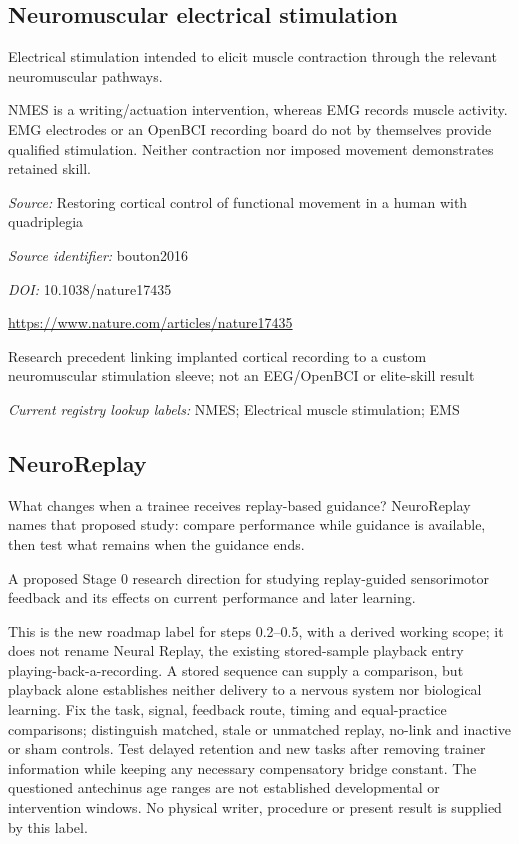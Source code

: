 \begin{samepage}
\subsection*{Neuromuscular electrical stimulation}
\noindent Electrical stimulation intended to elicit muscle contraction through the relevant neuromuscular pathways.\par
\end{samepage}
\noindent NMES is a writing/actuation intervention, whereas EMG records muscle activity. EMG electrodes or an OpenBCI recording board do not by themselves provide qualified stimulation. Neither contraction nor imposed movement demonstrates retained skill.\par



\noindent\textit{Source:} Restoring cortical control of functional movement in a human with quadriplegia\par
\noindent\textit{Source identifier:} bouton2016\par
\noindent\textit{DOI:} 10.1038/nature17435\par
\noindent\url{https://www.nature.com/articles/nature17435}\par
\noindent Research precedent linking implanted cortical recording to a custom neuromuscular stimulation sleeve; not an EEG/OpenBCI or elite-skill result\par


\noindent\textit{Current registry lookup labels:} NMES; Electrical muscle stimulation; EMS\par

\subsection*{NeuroReplay}
\noindent What changes when a trainee receives replay-based guidance? NeuroReplay names that proposed study: compare performance while guidance is available, then test what remains when the guidance ends.\par
\noindent A proposed Stage 0 research direction for studying replay-guided sensorimotor feedback and its effects on current performance and later learning.\par
\noindent This is the new roadmap label for steps 0.2–0.5, with a derived working scope; it does not rename Neural Replay, the existing stored-sample playback entry playing-back-a-recording. A stored sequence can supply a comparison, but playback alone establishes neither delivery to a nervous system nor biological learning. Fix the task, signal, feedback route, timing and equal-practice comparisons; distinguish matched, stale or unmatched replay, no-link and inactive or sham controls. Test delayed retention and new tasks after removing trainer information while keeping any necessary compensatory bridge constant. The questioned antechinus age ranges are not established developmental or intervention windows. No physical writer, procedure or present result is supplied by this label.\par

